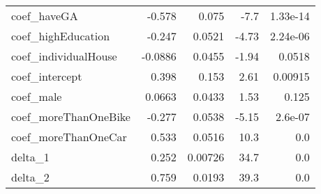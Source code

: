 \begin{tabular}{lrrrr}
coef_haveGA & -0.578 & 0.075 & -7.7 & 1.33e-14 \\
coef_highEducation & -0.247 & 0.0521 & -4.73 & 2.24e-06 \\
coef_individualHouse & -0.0886 & 0.0455 & -1.94 & 0.0518 \\
coef_intercept & 0.398 & 0.153 & 2.61 & 0.00915 \\
coef_male & 0.0663 & 0.0433 & 1.53 & 0.125 \\
coef_moreThanOneBike & -0.277 & 0.0538 & -5.15 & 2.6e-07 \\
coef_moreThanOneCar & 0.533 & 0.0516 & 10.3 & 0.0 \\
delta_1 & 0.252 & 0.00726 & 34.7 & 0.0 \\
delta_2 & 0.759 & 0.0193 & 39.3 & 0.0 \\
\end{tabular}

